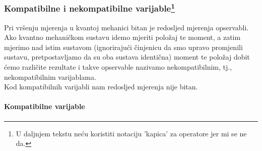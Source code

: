 \documentclass{article}
\numberwithin{equation}{section}
\begin{document}
\subsubsection{Kompatibilne i nekompatibilne varijable\footnote{U daljnjem tekstu neću koristiti notaciju 'kapica' za operatore jer mi se ne da.}}
Pri vršenju mjerenja u kvantoj mehanici bitan je redosljed mjerenja opservabli. Ako kvantno mehaničkom sustavu idemo mjeriti
položaj te moment, a zatim mjerimo nad istim sustavom (ignorirajući činjenicu da smo upravo promjenili sustavu,
pretpostavljamo da su oba sustava identična) moment te položaj dobit ćemo različite rezultate i takve opservable nazivamo nekompatibilnim,
tj., nekompatibilnim varijablama.\\
Kod kompatibilnih varijabli nam redosljed mjerenja nije bitan.
\paragraph{Kompatibilne varijable}
\end{document}
